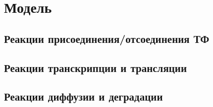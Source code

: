 \section{Модель}
\begin{figure}[h]
\end{figure}
\subsection{Реакции присоединения/отсоединения ТФ}
\begin{figure}[!h]
\end{figure}
\subsection{Реакции транскрипции и трансляции}
\begin{figure}[!h]
\end{figure}
\subsection{Реакции диффузии и деградации}
\begin{figure}[!h]
\end{figure}
